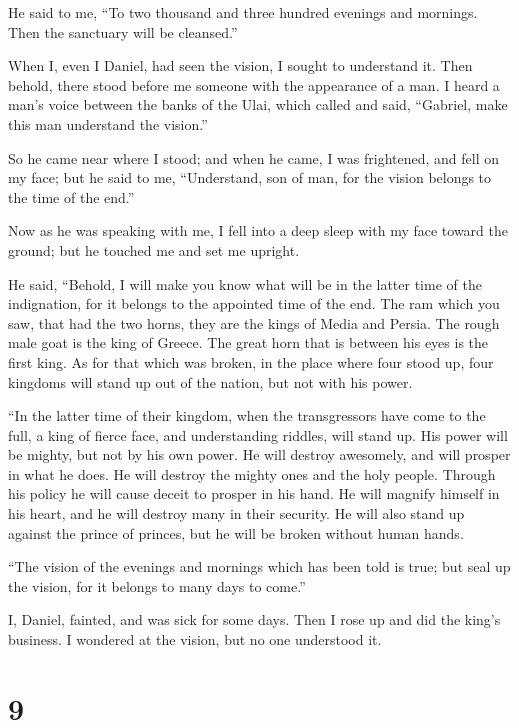  He said to me, ``To two thousand and three hundred
evenings and mornings. Then the sanctuary will be cleansed.''

 When I, even I Daniel, had seen the vision, I sought to
understand it. Then behold, there stood before me someone with the
appearance of a man.  I heard a man's voice between the
banks of the Ulai, which called and said, ``Gabriel, make this man
understand the vision.''

 So he came near where I stood; and when he came, I was
frightened, and fell on my face; but he said to me, ``Understand, son of
man, for the vision belongs to the time of the end.''

 Now as he was speaking with me, I fell into a deep sleep
with my face toward the ground; but he touched me and set me upright.

 He said, ``Behold, I will make you know what will be in
the latter time of the indignation, for it belongs to the appointed time
of the end.  The ram which you saw, that had the two horns,
they are the kings of Media and Persia.  The rough male
goat is the king of Greece. The great horn that is between his eyes is
the first king.  As for that which was broken, in the place
where four stood up, four kingdoms will stand up out of the nation, but
not with his power.

 ``In the latter time of their kingdom, when the
transgressors have come to the full, a king of fierce face, and
understanding riddles, will stand up.  His power will be
mighty, but not by his own power. He will destroy awesomely, and will
prosper in what he does. He will destroy the mighty ones and the holy
people.  Through his policy he will cause deceit to prosper
in his hand. He will magnify himself in his heart, and he will destroy
many in their security. He will also stand up against the prince of
princes, but he will be broken without human hands.

 ``The vision of the evenings and mornings which has been
told is true; but seal up the vision, for it belongs to many days to
come.''

 I, Daniel, fainted, and was sick for some days. Then I
rose up and did the king's business. I wondered at the vision, but no
one understood it.

\hypertarget{section-8}{%
\section{9}\label{section-8}}

